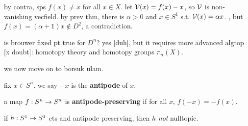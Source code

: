 \begin{pf}[source=Primary Source Material]
    by contra, sps $f(x)\neq x$ for all $x\in X$.
    let $\mathcal{V}(x)=f(x)-x$, so $\mathcal{V}$ is non-vanishing vecfield.
    by prev thm, there is $\alpha>0$ and $x\in S^{1}$ s.t. $\mathcal{V}(x)=\alpha x$.
,
    but $f(x)=(\alpha+1)x\notin D^{2}$, a contradiction.
\end{pf}
is brouwer fixed pt true for $D^{n}$?
yes [duh], but it requires more advanced algtop [x doubt]:
homotopy theory and homotopy groups $\pi_{n}(X)$.


we now move on to borsuk ulam.

\begin{defn}
    fix $x\in S^{n}$.
    we say $-x$ is the \textbf{antipode} of $x$.
    
    a map $f:S^{n}\rightarrow S^{n}$ is \textbf{antipode-preserving} if for all $x$, $f(-x)=-f(x)$.
\end{defn}

\begin{prop}
    if $h:S^{1}\rightarrow S^{1}$ cts and antipode preserving, then $h$ \textit{not} nulltopic.
\end{prop}

